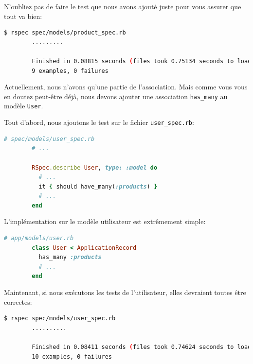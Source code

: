 \documentclass[]{report}
\begin{document}
      N'oubliez pas de faire le test que nous avons ajouté juste pour vous assurer que tout va bien:

      \begin{scriptsize}
        \begin{lstlisting}[language=bash]
        $ rspec spec/models/product_spec.rb
        .........

        Finished in 0.08815 seconds (files took 0.75134 seconds to load)
        9 examples, 0 failures
        \end{lstlisting}
      \end{scriptsize}

      Actuellement, nous n'avons qu'une partie de l'association.  Mais comme vous vous en doutez peut-être déjà, nous devons ajouter une association \verb|has_many| au modèle \verb|User|.

      Tout d'abord, nous ajoutons le test sur le fichier \verb|user_spec.rb|:

      \begin{scriptsize}
        \begin{lstlisting}[language=ruby]
        # spec/models/user_spec.rb
        # ...

        RSpec.describe User, type: :model do
          # ...
          it { should have_many(:products) }
          # ...
        end
        \end{lstlisting}
      \end{scriptsize}

      L'implémentation sur le modèle utilisateur est extrêmement simple:

      \begin{scriptsize}
        \begin{lstlisting}[language=ruby]
        # app/models/user.rb
        class User < ApplicationRecord
          has_many :products
          # ...
        end
        \end{lstlisting}
      \end{scriptsize}

      Maintenant, si nous exécutons les tests de l'utilisateur, elles devraient toutes être correctes:

      \begin{scriptsize}
        \begin{lstlisting}[language=bash]
        $ rspec spec/models/user_spec.rb
        ..........

        Finished in 0.08411 seconds (files took 0.74624 seconds to load)
        10 examples, 0 failures
        \end{lstlisting}
      \end{scriptsize}
\end{document}
